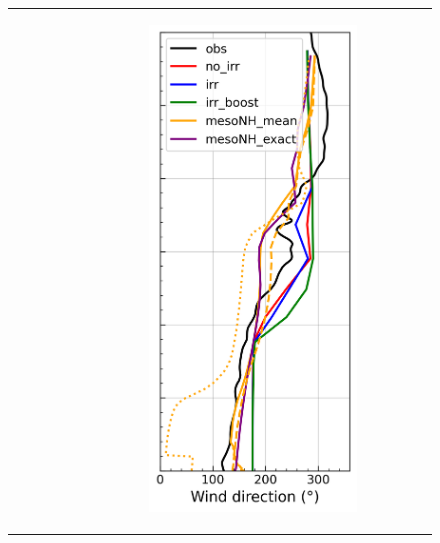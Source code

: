 \begin{figure}[hbtp]
{\begin{tabular}{@{}cccc@{}}
\begin{subfigure}[t]{0.283\textwidth}
        \end{subfigure} &
        \begin{subfigure}[t]{0.283\textwidth}
            \caption{}
            \includegraphics[width=\textwidth]{images/chap6/profiles/profile_elsplans_wind_direction_2007_sensbins.png}

\end{subfigure}
\end{tabular}}
\end{figure}
